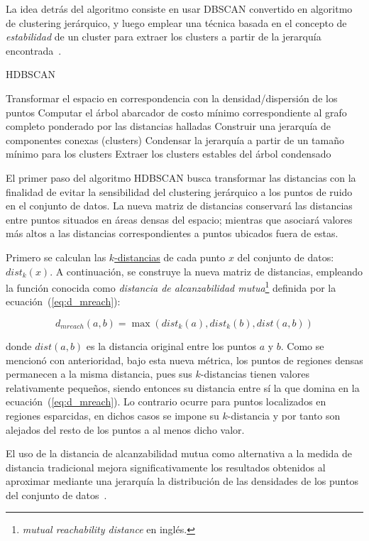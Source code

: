 La idea detrás del algoritmo consiste en usar DBSCAN convertido en algoritmo de clustering jerárquico, y luego emplear una técnica basada en el concepto de \textit{estabilidad} de un cluster para extraer los clusters a partir de la jerarquía encontrada~\cite{McInnes17}.

\begin{algorithm}
    \caption{HDBSCAN}
    \label{algorithm:HDBSCAN}
    Transformar el espacio en correspondencia con la densidad/dispersión de los puntos\;
    Computar el árbol abarcador de costo mínimo correspondiente al grafo completo ponderado por las distancias halladas\;
    Construir una jerarquía de componentes conexas (clusters)\;
    Condensar la jerarquía a partir de un tamaño mínimo para los clusters\;
    Extraer los clusters estables del árbol condensado\;
\end{algorithm}

El primer paso del algoritmo HDBSCAN busca transformar las distancias con la finalidad de evitar la sensibilidad del clustering jerárquico a los puntos de ruido en el conjunto de datos.
La nueva matriz de distancias conservará las distancias entre puntos situados en áreas densas del espacio;
mientras que asociará valores más altos a las distancias correspondientes a puntos ubicados fuera de estas.

Primero se calculan las \hyperref[subsubsec:paramsDBSCAN]{$k$-distancias} de cada punto $x$ del conjunto de datos: $dist_k(x)$.
A continuación, se construye la nueva matriz de distancias, empleando la función conocida como \textit{distancia de alcanzabilidad mutua}\footnote{\textit{mutual reachability distance} en inglés.} definida por la ecuación~(\ref{eq:d_mreach}):

\begin{equation}
    \label{eq:d_mreach}
    d_{mreach}(a,b)=\max(dist_k(a), dist_k(b), dist(a,b))
\end{equation}

\noindent
donde $dist(a,b)$ es la distancia original entre los puntos $a$ y $b$.
Como se mencionó con anterioridad, bajo esta nueva métrica, los puntos de regiones densas permanecen a la misma distancia, pues sus $k$-distancias tienen valores relativamente pequeños, siendo entonces su distancia entre sí la que domina en la ecuación~(\ref{eq:d_mreach}).
Lo contrario ocurre para puntos localizados en regiones esparcidas, en dichos casos se impone su $k$-distancia y por tanto son alejados del resto de los puntos a al menos dicho valor.

El uso de la distancia de alcanzabilidad mutua como alternativa a la medida de distancia tradicional mejora significativamente los resultados obtenidos al aproximar mediante una jerarquía la distribución de las densidades de los puntos del conjunto de datos~\cite{Eldridge15}.

